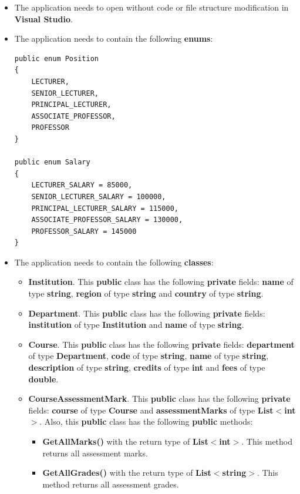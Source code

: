 \documentclass{article}
\begin{document}
\begin{itemize}
    \item The application needs to open without code or file structure modification in \textbf{Visual Studio}.
    \item The application needs to contain the following \textbf{enums}:
    \begin{verbatim}
public enum Position
{
    LECTURER,
    SENIOR_LECTURER,
    PRINCIPAL_LECTURER,
    ASSOCIATE_PROFESSOR,
    PROFESSOR
}
    
public enum Salary
{
    LECTURER_SALARY = 85000,
    SENIOR_LECTURER_SALARY = 100000,
    PRINCIPAL_LECTURER_SALARY = 115000,
    ASSOCIATE_PROFESSOR_SALARY = 130000,
    PROFESSOR_SALARY = 145000
}
    \end{verbatim}
    \item The application needs to contain the following \textbf{classes}:
    \begin{itemize}
        \item \textbf{Institution}. This \textbf{public} class has the following \textbf{private} fields: \textbf{name} of type \textbf{string}, \textbf{region} of type \textbf{string} and \textbf{country} of type \textbf{string}. 
        \item \textbf{Department}. This \textbf{public} class has the following \textbf{private} fields: \textbf{institution} of type \textbf{Institution} and \textbf{name} of type \textbf{string}.
        \item \textbf{Course}. This \textbf{public} class has the following \textbf{private} fields: \textbf{department} of type \textbf{Department}, \textbf{code} of type \textbf{string}, \textbf{name} of type \textbf{string}, \textbf{description} of type \textbf{string}, \textbf{credits} of type \textbf{int} and \textbf{fees} of type \textbf{double}.
        \item \textbf{CourseAssessmentMark}. This \textbf{public} class has the following \textbf{private} fields: \textbf{course} of type \textbf{Course} and \textbf{assessmentMarks} of type \textbf{List$<$int$>$}. Also, this \textbf{public} class has the following \textbf{public} methods:
        \begin{itemize}
            \item \textbf{GetAllMarks()} with the return type of \textbf{List$<$int$>$}. This method returns all assessment marks.
            \item \textbf{GetAllGrades()} with the return type of \textbf{List$<$string$>$}. This method returns all assessment grades.

\end{itemize}
\end{itemize}
\end{itemize}
\end{document}
